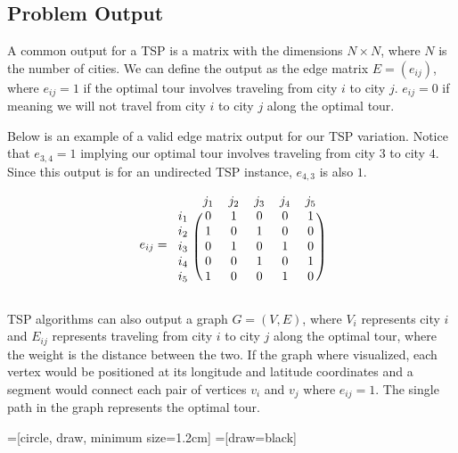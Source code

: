\documentclass[11pt,fleqn]{article}
\begin{document}
\subsection{Problem Output}
A common output for a TSP is a matrix with the dimensions $N\times N$, where
$N$ is the number of cities.  We can define the output as the edge matrix
$E = (e_{ij})$, where $e_{ij}=1$ if the optimal tour involves
traveling from city $i$ to city $j$.  $e_{ij}=0$ if meaning we will not
travel from city $i$ to city $j$ along the optimal tour.
\par

Below is an example of a valid edge matrix output for our TSP variation.
Notice that $e_{3,4}=1$ implying our optimal tour involves traveling from
city $3$ to city $4$.  Since this output is for an undirected TSP instance,
$e_{4,3}$ is also $1$.
\par

\begin{align*}
  e_{ij}=
  \begin{blockarray}{cccccc}
    & j_1 & j_2 & j_3 & j_4 & j_5 \\
  \begin{block}{c(ccccc)}
    i_1 & 0 & 1 & 0 & 0 & 1 \\
    i_2 & 1 & 0 & 1 & 0 & 0 \\
    i_3 & 0 & 1 & 0 & 1 & 0 \\
    i_4 & 0 & 0 & 1 & 0 & 1 \\
    i_5 & 1 & 0 & 0 & 1 & 0 \\
  \end{block}
  \end{blockarray}
\end{align*}

TSP algorithms can also output a graph $G=(V,E)$, where $V_i$
represents city $i$ and $E_{ij}$ represents traveling from city $i$ to
city $j$ along the optimal tour, where the weight is the distance between
the two.  If the graph where visualized, each vertex would be positioned
at its longitude and latitude coordinates and a segment would connect each pair
of vertices $v_i$ and $v_j$ where $e_{ij}=1$.  The single path in the graph
represents the optimal tour.
\par

=[circle, draw, minimum size=1.2cm]
=[draw=black]
\end{document}
